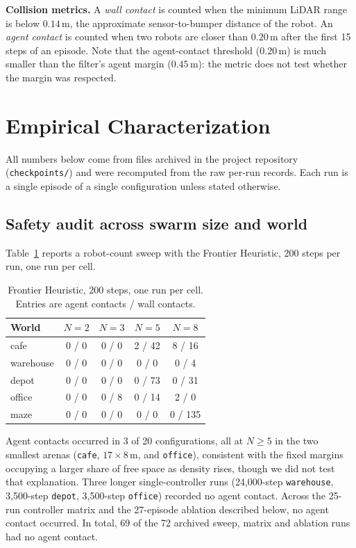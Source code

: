 \documentclass[12pt]{article}
\newcommand{\si}[1]{\mathrm{#1}}
\begin{document}
\textbf{Collision metrics.} A \emph{wall contact} is counted when the
minimum LiDAR range is below $0.14\,\si{m}$, the approximate sensor-to-bumper
distance of the robot. An \emph{agent contact} is counted when two robots
are closer than $0.20\,\si{m}$ after the first 15 steps of an episode. Note
that the agent-contact threshold ($0.20\,\si{m}$) is much smaller than the
filter's agent margin ($0.45\,\si{m}$): the metric does not test whether the
margin was respected.

\section{Empirical Characterization}
\label{sec:empirical}
All numbers below come from files archived in the project repository
(\texttt{checkpoints/}) and were recomputed from the raw per-run records.
Each run is a single episode of a single configuration unless stated
otherwise.

\subsection{Safety audit across swarm size and world}
Table~\ref{tab:sweep} reports a robot-count sweep with the Frontier
Heuristic, 200 steps per run, one run per cell.

\begin{table}[h]
\centering
\caption{Frontier Heuristic, 200 steps, one run per cell. Entries are agent contacts / wall contacts.}
\label{tab:sweep}
\begin{tabular}{lcccc}
\toprule
World & $N{=}2$ & $N{=}3$ & $N{=}5$ & $N{=}8$ \\
\midrule
cafe      & 0 / 0 & 0 / 0 & 2 / 42 & 8 / 16 \\
warehouse & 0 / 0 & 0 / 0 & 0 / 0  & 0 / 4 \\
depot     & 0 / 0 & 0 / 0 & 0 / 73 & 0 / 31 \\
office    & 0 / 0 & 0 / 8 & 0 / 14 & 2 / 0 \\
maze      & 0 / 0 & 0 / 0 & 0 / 0  & 0 / 135 \\
\bottomrule
\end{tabular}
\end{table}

Agent contacts occurred in 3 of 20 configurations, all at $N\ge5$ in the two
smallest arenas (\texttt{cafe}, $17\times8\,\si{m}$, and \texttt{office}),
consistent with the fixed margins occupying a larger share of free space as
density rises, though we did not test that explanation. Three longer
single-controller runs (24{,}000-step \texttt{warehouse}, 3{,}500-step
\texttt{depot}, 3{,}500-step \texttt{office}) recorded no agent contact.
Across the 25-run controller matrix and the 27-episode ablation described
below, no agent contact occurred. In total, 69 of the 72 archived sweep,
matrix and ablation runs had no agent contact.
\end{document}
